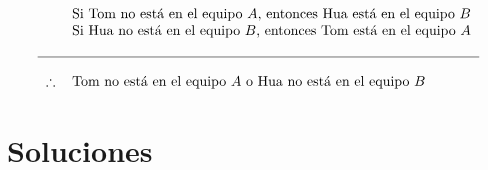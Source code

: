 \documentclass[10pt]{report}
\begin{document}
\begin{enumerate}
	\[
        \begin{tabular}{ cl}
        	& Si Tom no está en el equipo $A$, entonces Hua está en el equipo $B$ \\
        	& Si Hua no está en el equipo $B$, entonces Tom está en el equipo $A$ \\
        	&  \\
        	\hline \\
        	$\therefore$ &  Tom no está en el equipo $A$ o Hua no está en el equipo $B$ \\
        \end{tabular}
    \]
	
\end{enumerate}

\newpage


\section*{Soluciones}
\end{document}
